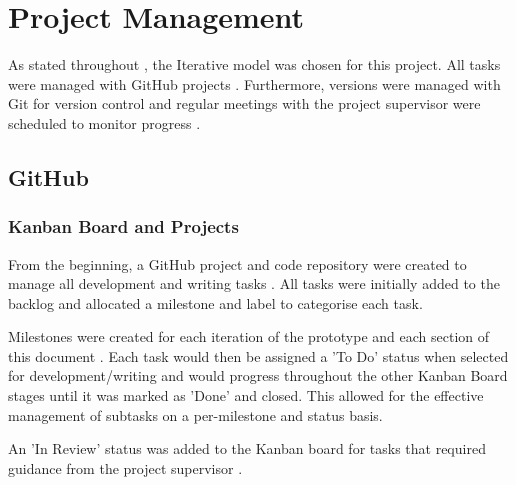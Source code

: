 \chapter{Project Management}
\label{chap:pm}

As stated throughout , the Iterative model was chosen for this project. All tasks were managed with GitHub projects . Furthermore, versions were managed with Git for version control  and regular meetings with the project supervisor were scheduled to monitor progress .

\section{GitHub}

\subsection{Kanban Board and Projects}
\label{pm:kanban}

From the beginning, a GitHub project and code repository were created to manage all development and writing tasks . All tasks were initially added to the backlog and allocated a milestone and label to categorise each task.

Milestones were created for each iteration of the prototype and each section of this document . Each task would then be assigned a 'To Do' status when selected for development/writing and would progress throughout the other Kanban Board stages until it was marked as 'Done' and closed. This allowed for the effective management of subtasks on a per-milestone and status basis.

An 'In Review' status was added to the Kanban board for tasks that required guidance from the project supervisor .

